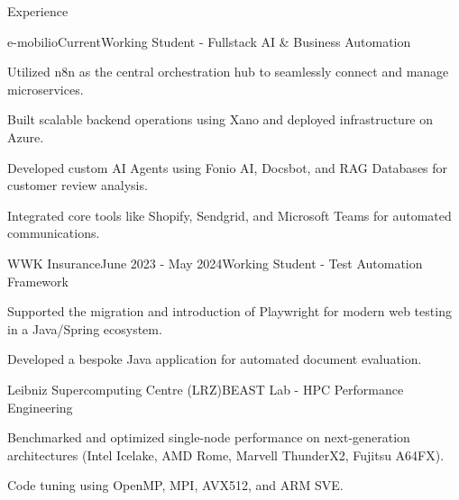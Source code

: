 \documentclass{resume} %
\begin{document}
\begin{rSection}{Experience}

\begin{rSubsection}{e-mobilio}{Current}{Working Student - Fullstack AI \& Business Automation}{}
\item Utilized n8n as the central orchestration hub to seamlessly connect and manage microservices.
\item Built scalable backend operations using Xano and deployed infrastructure on Azure.
\item Developed custom AI Agents using Fonio AI, Docsbot, and RAG Databases for customer review analysis.
\item Integrated core tools like Shopify, Sendgrid, and Microsoft Teams for automated communications.
\end{rSubsection}

\begin{rSubsection}{WWK Insurance}{June 2023 - May 2024}{Working Student - Test Automation Framework}{}
\item Supported the migration and introduction of Playwright for modern web testing in a Java/Spring ecosystem.
\item Developed a bespoke Java application for automated document evaluation.
\end{rSubsection}

\begin{rSubsection}{Leibniz Supercomputing Centre (LRZ)}{}{BEAST Lab - HPC Performance Engineering}{}
\item Benchmarked and optimized single-node performance on next-generation architectures (Intel Icelake, AMD Rome, Marvell ThunderX2, Fujitsu A64FX).
\item Code tuning using OpenMP, MPI, AVX512, and ARM SVE.
\end{rSubsection}

\end{rSection} 
\end{document}
